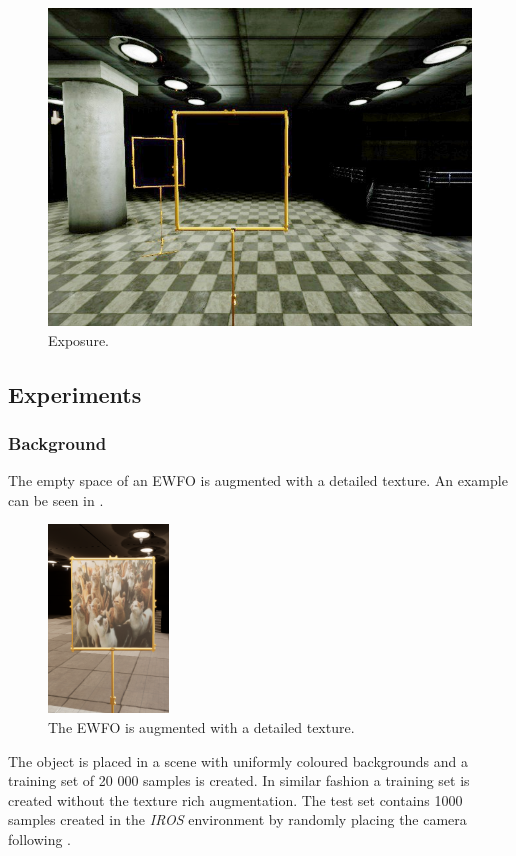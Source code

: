 \begin{figure}[htbp]
\begin{minipage}{0.33\textwidth}
		\includegraphics[width=\textwidth]{fig/gate_example_exposure}
		\caption{Exposure.}
		\label{fig:exposure}
	\end{minipage}
\end{figure}



\subsection{Experiments}

\subsubsection{Background}

The empty space of an \ac{EWFO} is augmented with a detailed texture. An example can be seen in .
\begin{figure}
	\centering
	\includegraphics[height=5cm]{fig/cat}
	\caption{The \ac{EWFO} is augmented with a detailed texture.}
	\label{fig:cats}
\end{figure}

The object is placed in a scene with uniformly coloured backgrounds and a training set of 20 000 samples is created. In similar fashion a training set is created without the texture rich augmentation. The test set contains 1000 samples created in the \textit{IROS} environment by randomly placing the camera following .


